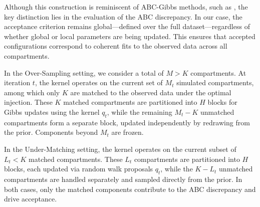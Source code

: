 Although this construction is reminiscent of ABC-Gibbs methods, such as \citet{clarte2021componentwise}, the key distinction lies in the evaluation of the ABC discrepancy. In our case, the acceptance criterion remains global—defined over the full dataset—regardless of whether global or local parameters are being updated. This ensures that accepted configurations correspond to coherent fits to the observed data across all compartments.

In the Over-Sampling setting, we consider a total of \( M > K \) compartments. At iteration \( t \), the kernel operates on the current set of \( M_t \) simulated compartments, among which only \( K \) are matched to the observed data under the optimal injection. These \( K \) matched compartments are partitioned into \( H \) blocks for Gibbs updates using the kernel \( q_t \), while the remaining \( M_t - K \) unmatched compartments form a separate block, updated independently by redrawing from the prior. Components beyond \( M_t \) are frozen.

In the Under-Matching setting, the kernel operates on the current subset of \( L_t < K \) matched compartments. These \( L_t \) compartments are partitioned into \( H \) blocks, each updated via random walk proposals \( q_t \), while the \( K - L_t \) unmatched compartments are handled separately and sampled directly from the prior. In both cases, only the matched components contribute to the ABC discrepancy and drive acceptance.


